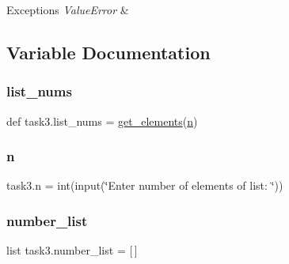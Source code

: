 \begin{DoxyExceptions}{Exceptions}
{\em Value\+Error} & \\
\hline
\end{DoxyExceptions}


\subsection{Variable Documentation}
\mbox{\label{namespacetask3_a26ec30892cf27640bc93aefe095de62a}} 
\subsubsection{\texorpdfstring{list\+\_\+nums}{list\_nums}}
{\footnotesize\ttfamily def task3.\+list\+\_\+nums = \hyperlink{namespacetask3_ad235ae9c5b4e9828ff490ff427b9bd86}{get\+\_\+elements}(\hyperlink{namespacetask3_a141f37c5285947e978ad4fb5f93d7b4d}{n})}

\mbox{\label{namespacetask3_a141f37c5285947e978ad4fb5f93d7b4d}} 
\subsubsection{\texorpdfstring{n}{n}}
{\footnotesize\ttfamily task3.\+n = int(input(\char`\"{}Enter number of elements of list\+: \char`\"{}))}

\mbox{\label{namespacetask3_aec01fd90952df5299806dd54eb3b2dd9}} 
\subsubsection{\texorpdfstring{number\+\_\+list}{number\_list}}
{\footnotesize\ttfamily list task3.\+number\+\_\+list = \mbox{[}$\,$\mbox{]}}

